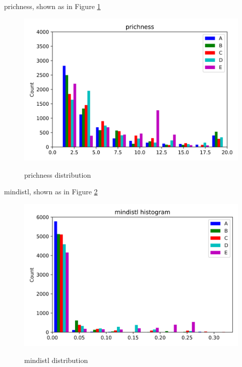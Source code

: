 \documentclass{article}
\begin{document}
prichness, shown as in Figure \ref{prichness} \par
\begin{figure}[H]
	\centering
	\includegraphics[width=\textwidth, keepaspectratio]{prichness.png}\\
	\caption{prichness distribution}
	\label{prichness}
\end{figure}


mindistl, shown as in Figure \ref{mindistl}
\begin{figure}[H]
	\centering
	\includegraphics[width=\textwidth, keepaspectratio]{mindistl.png}\\
	\caption{mindistl distribution}
	\label{mindistl}
\end{figure}
\end{document}
